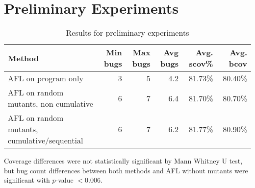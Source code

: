 \section{Preliminary Experiments}

\begin{table*}
\begin{tabular}{l|r|r|r|r|r}
  Method & Min bugs & Max bugs & Avg bugs & Avg. scov\% & Avg. bcov \\
  \hline
  AFL on program only & 3 & 5 & 4.2 & 81.73\% & 80.40\%\\
  \hline
  AFL on random mutants, non-cumulative  & 6 & 7 & 6.4 & 81.70\% & 80.70\%\\
  \hline
  AFL on random mutants, cumulative/sequential & 6 & 7 & 6.2 & 81.77\%
  & 80.90\%\\
  \hline
\end{tabular}
\caption{Results for preliminary experiments}
\end{table*}

Coverage differences were not statistically significant by Mann
Whitney U test, but bug count differences between both methods and AFL
without mutants were significant with $p$-value $< 0.006$.